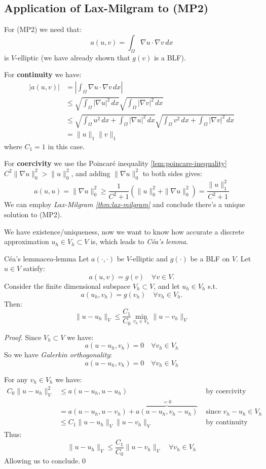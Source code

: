 \subsection{Application of Lax-Milgram to (MP2)}
For (MP2) we need that:
\[
    a(u, v) = \int_\Omega \nabla u \cdot \nabla v \, dx
\]
is $V$-elliptic (we have already shown that $g(v)$ is a BLF).

For \textbf{continuity} we have:
\begin{align*}
    |a(u, v)| & = \left|\int_\Omega \nabla u \cdot \nabla v \, dx\right|                         \\
              & \leq \sqrt{\int_\Omega |\nabla u|^2 \, dx} \sqrt{\int_\Omega |\nabla v|^2 \, dx} \\
              & \leq \sqrt{\int_\Omega u^2 \, dx + \int_\Omega |\nabla u|^2 \, dx} \sqrt{\int_\Omega v^2 \, dx + \int_\Omega |\nabla v|^2 \, dx} \\
                & = \|u\|_1 \|v\|_1
\end{align*}
where $C_1 = 1$ in this case.

For \textbf{coercivity} we use the Poincaré inequality \ref{lem:poincare-inequality} $C^2 \|\nabla u\|_0^2 > \|u\|_0^2$, and adding $\|\nabla u\|_0^2$ to both sides gives:
\[
    a(u, u) = \|\nabla u\|_0^2 \geq \frac{1}{C^2 + 1} \left(\|u\|_0^2 + \|\nabla u\|_0^2\right) = \frac{\|u\|_1^2}{C^2 + 1}
\]
We can employ \emph{Lax-Milgram \ref{thm:lax-milgram}} and conclude there's a unique solution to (MP2).

We have existence/uniqueness, now we want to know how accurate a discrete approximation $u_h \in V_h \subset V$ is, which leads to \emph{Céa's lemma}.

\begin{theorem}{Céa's lemma}{cea-lemma}
    Let $a(\cdot, \cdot)$ be $V$-elliptic and $g(\cdot)$ be a BLF on $V$. Let $u \in V$ satisfy:
    \[
        a(u, v) = g(v) \quad \forall v \in V.
    \]
    Consider the finite dimensional subspace $V_h \subset V$, and let $u_h \in V_h$ s.t.
    \[
        a(u_h, v_h) = g(v_h) \quad \forall v_h \in V_h.
    \]
    Then:
    \[
        \|u - u_h\|_V \leq \frac{C_1}{C_0} \min_{v_h \in V_h} \|u - v_h\|_V
    \]
\end{theorem}
\begin{proof}
    Since $V_h \subset V$ we have:
    \[
        a(u - u_h, v_h) = 0 \quad \forall v_h \in V_h
    \]
    So we have \emph{Galerkin orthogonality}:
    \[
        a(u - u_h,v_h) = 0 \quad \forall v_h \in V_h
    \]

    \medskip

    For any $v_h \in V_h$ we have:
    \begin{align*}
        C_0 \|u - u_h\|_V^2 & \leq a(u - u_h, u - u_h) &\text{ by coercivity} \\
                            & = a(u - u_h, u - v_h) + \overbrace{a(u - u_h, v_h - u_h)}^{= 0} &\text{ since } v_h - u_h \in V_h \\
                            & \leq C_1 \|u - u_h\|_V \|u - v_h\|_V &\text{ by continuity}
    \end{align*}
    Thus:
    \[
        \|u - u_h\|_V \leq \frac{C_1}{C_0} \|u - v_h\|_V \quad \forall v_h \in V_h
    \]
    Allowing us to conclude.\qed
\end{proof}